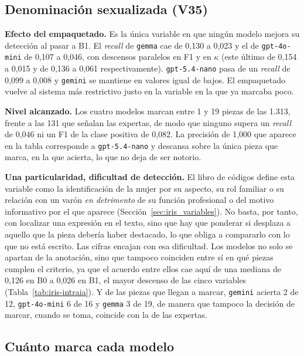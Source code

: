 \subsection{Denominación sexualizada (V35)}



\textbf{Efecto del empaquetado.} Es la única variable en que ningún modelo mejora su
detección al pasar a B1. El \textit{recall} de \texttt{gemma} cae de 0,130 a 0,023 y el de
\texttt{gpt-4o-mini} de 0,107 a 0,046, con descensos paralelos en F1 y en $\kappa$
(este último de 0,154 a 0,015 y de 0,136 a 0,061 respectivamente). \texttt{gpt-5.4-nano}
pasa de un \textit{recall} de 0,099 a 0,008 y \texttt{gemini} se mantiene en valores igual de
bajos. El empaquetado vuelve al sistema más restrictivo justo en la variable en la que
ya marcaba poco.

\textbf{Nivel alcanzado.} Los cuatro modelos marcan entre 1 y 19 piezas de las 1.313,
frente a las 131 que señalan las expertas, de modo que ninguno supera un \textit{recall} de
0,046 ni un F1 de la clase positiva de 0,082. La precisión de 1,000 que aparece en la
tabla corresponde a \texttt{gpt-5.4-nano} y descansa sobre la única pieza que marca, en
la que acierta, lo que no deja de ser notorio.

\textbf{Una particularidad, dificultad de detección.} El libro de códigos define esta
variable como la identificación de la mujer por su aspecto, su rol familiar o su
relación con un varón \emph{en detrimento} de su función profesional o del motivo
informativo por el que aparece (Sección~\ref{sec:iris_variables}). No basta, por tanto,
con localizar una expresión en el texto, sino que hay que ponderar si desplaza a
aquello que la pieza debería haber destacado, lo que obliga a compararlo con lo que no
está escrito. Las cifras encajan con esa dificultad. Los modelos no solo se apartan de la anotación,
sino que tampoco coinciden entre sí en qué piezas cumplen el criterio, ya que el
acuerdo entre ellos cae aquí de una mediana de 0,126 en B0 a 0,026 en B1, el mayor
descenso de las cinco variables (Tabla~\ref{tab:iris-intraia}). Y de las piezas que
llegan a marcar, \texttt{gemini} acierta 2 de 12, \texttt{gpt-4o-mini} 6 de 16 y
\texttt{gemma} 3 de 19, de manera que tampoco la decisión de marcar, cuando se toma,
coincide con la de las expertas.

\subsection{Cuánto marca cada modelo}

